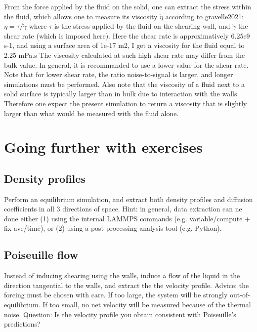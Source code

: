 From the force applied by the fluid on the solid, one can
extract the stress within the fluid, which allows one to
measure its viscosity $\dot{\eta}$ 
according to \href{https://pure.tudelft.nl/ws/portalfiles/portal/89280267/PhysRevFluids.6.034303.pdf}{gravelle2021}:
$\eta = \tau / \dot{\gamma}$ where $\tau$
is the stress applied by the fluid on the shearing wall, and
$\dot{\gamma}$ the shear rate (which is imposed
here). Here the shear rate is approximatively 6.25e9
s-1, and using a surface area of 1e-17 m2, I
get a viscosity for the fluid equal to 2.25 mPa.s
The viscosity calculated at such high shear rate may
differ from the bulk value. In general, it is recommanded to use a lower
value for the shear rate. Note that for lower shear rate, the ratio noise-to-signal
is larger, and longer simulations must be performed.
Also note that the viscosity of a fluid next to a solid surface is
typically larger than in bulk due to interaction with the
walls. Therefore one expect the present simulation to return 
a viscosity that is slightly larger than what would be measured with 
the fluid alone.

\section{Going further with exercises}

\noindent \subsection{Density profiles}

Perform an equilibrium simulation, and extract both density
profiles and diffusion coefficients in all 3 directions of
space.
Hint: in general, data extraction can ne done either (1)
using the internal LAMMPS commands (e.g. variable/compute
+ fix ave/time), or (2) using a post-processing analysis
tool (e.g. Python).

\subsection{Poiseuille flow}

\noindent Instead of inducing shearing using the walls, induce a flow
of the liquid in the direction tangential to the walls, and
extract the the velocity profile.
Advice: the forcing must be chosen with care. If too
large, the system will be strongly out-of-equilibrium. If
too small, no net velocity will be measured because of
the thermal noise.
Question: Is the velocity profile you obtain consistent with
Poiseuille's predictions?

